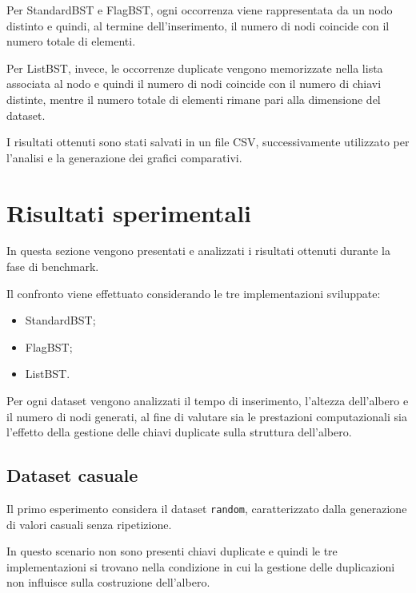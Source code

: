 \documentclass[a4paper,12pt]{article}
\begin{document}
Per StandardBST e FlagBST, ogni occorrenza viene rappresentata da un nodo distinto e quindi, al termine dell'inserimento, il numero di nodi coincide con il numero totale di elementi.

Per ListBST, invece, le occorrenze duplicate vengono memorizzate nella lista associata al nodo e quindi il numero di nodi coincide con il numero di chiavi distinte, mentre il numero totale di elementi rimane pari alla dimensione del dataset.

I risultati ottenuti sono stati salvati in un file CSV, successivamente utilizzato per l'analisi e la generazione dei grafici comparativi.

\section{Risultati sperimentali}

In questa sezione vengono presentati e analizzati i risultati ottenuti durante la fase di benchmark.

Il confronto viene effettuato considerando le tre implementazioni sviluppate:

\begin{itemize}

    \item StandardBST;

    \item FlagBST;

    \item ListBST.

\end{itemize}

Per ogni dataset vengono analizzati il tempo di inserimento, l'altezza dell'albero e il numero di nodi generati, al fine di valutare sia le prestazioni computazionali sia l'effetto della gestione delle chiavi duplicate sulla struttura dell'albero.

\subsection{Dataset casuale}

Il primo esperimento considera il dataset \texttt{random}, caratterizzato dalla generazione di valori casuali senza ripetizione.

In questo scenario non sono presenti chiavi duplicate e quindi le tre implementazioni si trovano nella condizione in cui la gestione delle duplicazioni non influisce sulla costruzione dell'albero.
\end{document}
